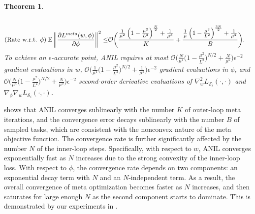 \documentclass{osudissert96}
\newtheorem{theorem}{Theorem}
\begin{document}
\begin{theorem}
\begin{align*}
\\\text{\normalfont (Rate w.r.t. $\phi$)}\; \mathbb{E}\left\| \frac{\partial L^{meta}(w,\phi)}{\partial \phi}\right\|^2  \leq & \mathcal{O}\bigg(\frac{ \frac{1}{\mu^2}\left(1-\frac{\mu^2}{L^2}\right)^{\frac{N}{2}}+\frac{1}{\mu^3}}{K} +\frac{\frac{1}{\mu}\left(1-\frac{\mu^2}{L^2}\right)^{\frac{3N}{2}}+\frac{1}{\mu^2}}{B}\bigg).
\end{align*}
To achieve an $\epsilon$-accurate point, ANIL requires at most {\small $\mathcal{O}\big(\frac{N}{\mu^{4}}\big(1-\frac{\mu^2}{L^2}\big)^{N/2}+\frac{N}{\mu^{5}}\big)\epsilon^{-2}$} 
 gradient evaluations in $w$,  {\small $\mathcal{O}\big(\frac{1}{\mu^{4}}\big(1-\frac{\mu^2}{L^2}\big)^{N/2}+\frac{1}{\mu^{5}}\big)\epsilon^{-2}$} gradient evaluations in $\phi$,  and {\small $\mathcal{O}\big(\frac{N}{\mu^{4}}\big(1-\frac{\mu^2}{L^2}\big)^{N/2}+\frac{N}{\mu^{5}}\big)\epsilon^{-2}$} second-order derivative evaluations of {\small$\nabla_w^2 L_{\mathcal{S}_i}(\cdot,\cdot)$} and {\small$\nabla_\phi\nabla_w L_{\mathcal{S}_i}(\cdot,\cdot)$}.
\end{theorem}
 shows that ANIL converges sublinearly with the number $K$ of outer-loop meta iterations, and the convergence error decays sublinearly with the number $B$ of sampled tasks, which are consistent with the nonconvex nature of the meta objective function. The convergence rate is further significantly affected by the number $N$ of the inner-loop steps. Specifically, with respect to $w$, ANIL converges exponentially fast as $N$ increases due to the strong convexity of the inner-loop loss. With respect to $\phi$, the convergence rate depends on two components: an exponential decay term with $N$ and an $N$-independent term. As a result, the overall convergence of meta optimization becomes faster as $N$ increases, and then saturates for large enough $N$ as the second component starts to dominate. 
This is demonstrated by our experiments in .
\end{document}
